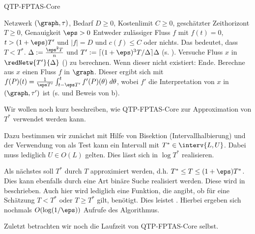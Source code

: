 \begin{algorithm}[H]
\caption{QTP-FPTAS-Core}
\label{alg:qtp_core}
\begin{algorithmic}[1]
    \REQUIRE Netzwerk $(\graph, \tau)$, Bedarf $D \geq 0$, Kostenlimit $C \geq 0$,
        geschätzter Zeithorizont $T \geq 0$, Genauigkeit $\eps > 0$
    \ENSURE Entweder zulässiger Fluss $f$ mit $f(t) = 0$, $t > (1+\eps) T'$
        und $|f| = D$ und $c(f) \leq C$ oder nichts. Das bedeutet, dass
        $T < T^*$.
    \STATE $\Delta := \frac{\eps^2 T}{n}$ und
        $T' := \lceil (1+\eps)^3 T / \Delta \rceil \Delta$ (s. ).
    \STATE Versuche Fluss $x$ in $\redNetw{T'}{\Delta}$ ()
        zu berechnen. Wenn dieser nicht existiert: Ende.
    \STATE Berechne aus $x$ einen Fluss $f$ in $\graph$. Dieser ergibt sich mit
        $f(P)(t) = \frac{1}{\eps T'}
                            \int_{t - \eps T'}^{t} f'(P)(\theta) \; d\theta$,
        wobei $f'$ die Interpretation von $x$ in $(\graph, \tau')$ ist
        (s.  und Beweis von b).
\end{algorithmic}
\end{algorithm}

Wir wollen noch kurz beschreiben, wie QTP-FPTAS-Core zur Approximation von
$T^*$ verwendet werden kann.

Dazu bestimmen wir zunächst mit Hilfe von Bisektion (Intervallhalbierung)
und der Verwendung von  als Test kann ein Intervall mit
$T^* \in \interv{L,U}$. Dabei muss lediglich $U \in O(L)$ gelten.
Dies lässt sich in $\log T^*$ realisieren.

Als nächstes soll $T^*$ durch $T$ approximiert werden,
d.h. $T^* \leq T \leq (1+\eps) T^*$. Dies kann ebenfalls durch eine Art binäre Suche
realisiert werden. Diese wird in \cite[Abschnitt 4]{Hassin} beschrieben. Auch hier
wird lediglich eine Funktion, die angibt, ob für eine Schätzung
$T < T^*$ oder $T \geq T^*$ gilt, benötigt. Dies leistet .
Hierbei ergeben sich nochmals $O(\log(1/\eps))$ Aufrufe des Algorithmus.

Zuletzt betrachten wir noch die Laufzeit von QTP-FPTAS-Core selbst.


